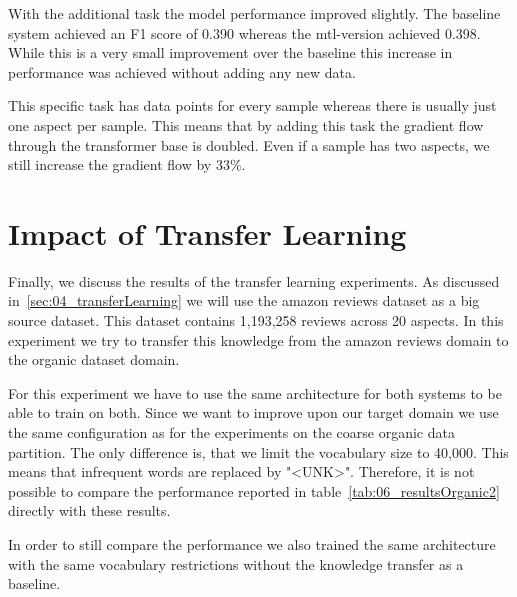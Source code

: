 With the additional task the model performance improved slightly. The baseline system achieved an F1 score of 0.390 whereas the \gls{mtl}-version achieved 0.398. While this is a very small improvement over the baseline this increase in performance was achieved without adding any new data.
\medskip

This specific task has data points for every sample whereas there is usually just one aspect per sample. This means that by adding this task the gradient flow through the transformer base is doubled. Even if a sample has two aspects, we still increase the gradient flow by 33\%.


\section{Impact of Transfer Learning}
\label{sec:06_ResultsTransfer}

Finally, we discuss the results of the transfer learning experiments. As discussed in~\ref{sec:04_transferLearning} we will use the amazon reviews dataset as a big source dataset. This dataset contains 1,193,258 reviews across 20 aspects. In this experiment we try to transfer this knowledge from the amazon reviews domain to the organic dataset domain.
\medskip

For this experiment we have to use the same architecture for both systems to be able to train on both. Since we want to improve upon our target domain we use the same configuration as for the experiments on the coarse organic data partition. The only difference is, that we limit the vocabulary size to 40,000. This means that infrequent words are replaced by "<UNK>". Therefore, it is not possible to compare the performance reported in table~\ref{tab:06_resultsOrganic2} directly with these results. 

In order to still compare the performance we also trained the same architecture with the same vocabulary restrictions without the knowledge transfer as a baseline.
\medskip

